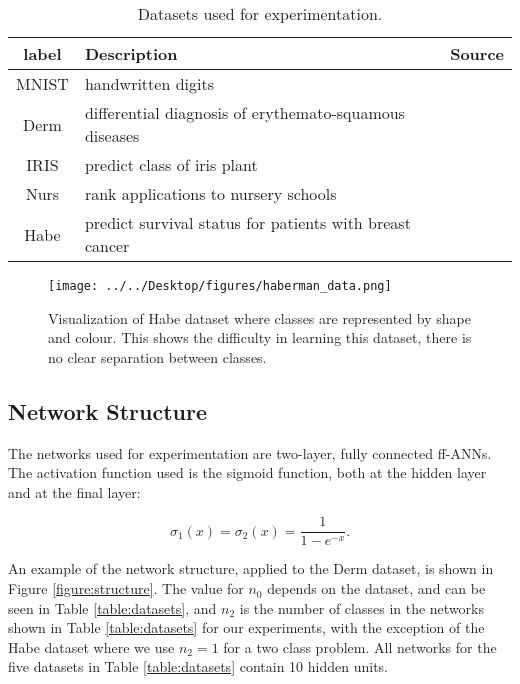 \documentclass[letterpaper,12pt,titlepage,oneside,final]{book}
\begin{document}
	\begin{table}[h]
		\begin{center}
			\begin{tabular}{ |c|l|c| }  
				\hline
				\textbf{label} & \textbf{Description} & \textbf{Source}\\
				\hline
				MNIST & handwritten digits & \cite{mnist}\\
				\hline
				Derm & differential diagnosis of erythemato-squamous diseases & \cite{Derm}\\
				\hline
				IRIS & predict class of iris plant & \cite{IRIS}\\
				\hline
				Nurs & rank applications to nursery schools & \cite{Nurs}\\
				\hline
				Habe & predict survival status for patients with breast cancer  & \cite{Habe}\\ 
				\hline
			\end{tabular}
		\end{center}
		\caption{Datasets used for experimentation.}
		\label{table:datasettopics}
	\end{table}
	
	\begin{figure}[h]
		\centering
		\texttt{[image: ../../Desktop/figures/haberman\_data.png]}
		\caption{Visualization of Habe dataset where classes are represented by shape and colour. This shows the difficulty in learning this dataset, there is no clear separation between classes.}
		\label{figure:haberman}
	\end{figure}
	
	
	\subsection{Network Structure}
	
	The networks used for experimentation are two-layer, fully connected ff-ANNs. The activation function used is the sigmoid function, both at the hidden layer and at the final layer:
	
	\begin{equation}
	\sigma_{1}(x) = \sigma_{2}(x) = \frac{1}{1 - e^{-x}}.
	\end{equation}
	
	An example of the network structure, applied to the Derm dataset, is shown in Figure \ref{figure:structure}. The value for $n_{0}$ depends on the dataset, and can be seen in Table \ref{table:datasets}, and $n_{2}$ is the number of classes in the networks shown in Table
	\ref{table:datasets} for our experiments, with the exception of the Habe dataset where we use $n_{2} = 1$ for a two class problem. All networks for the five datasets in Table \ref{table:datasets} contain 10 hidden units. 
	
\end{document}

